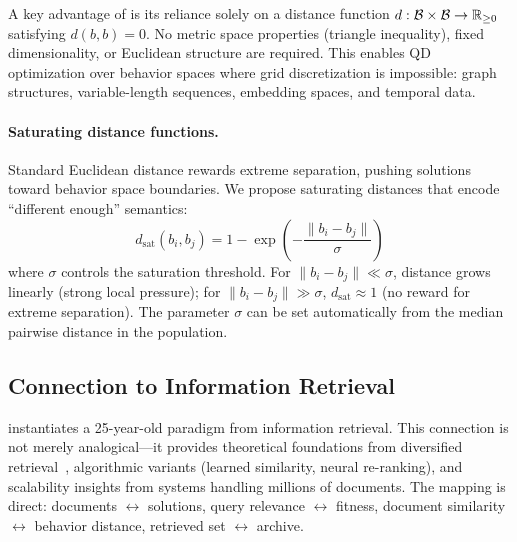A key advantage of \mmr is its reliance solely on a distance function $d: \mathcal{B} \times \mathcal{B} \to \mathbb{R}_{\geq 0}$ satisfying $d(b, b) = 0$.
No metric space properties (triangle inequality), fixed dimensionality, or Euclidean structure are required.
This enables QD optimization over behavior spaces where grid discretization is impossible: graph structures, variable-length sequences, embedding spaces, and temporal data.

\paragraph{Saturating distance functions.}
Standard Euclidean distance rewards extreme separation, pushing solutions toward behavior space boundaries.
We propose saturating distances that encode ``different enough'' semantics:
\begin{equation}
\label{eq:saturating}
d_{\text{sat}}(b_i, b_j) = 1 - \exp\left(-\frac{\|b_i - b_j\|}{\sigma}\right)
\end{equation}
where $\sigma$ controls the saturation threshold.
For $\|b_i - b_j\| \ll \sigma$, distance grows linearly (strong local pressure); for $\|b_i - b_j\| \gg \sigma$, $d_{\text{sat}} \approx 1$ (no reward for extreme separation).
The parameter $\sigma$ can be set automatically from the median pairwise distance in the population.

\subsection{Connection to Information Retrieval}
\label{sec:ir_connection}

\mmr instantiates a 25-year-old paradigm from information retrieval.
This connection is not merely analogical---it provides theoretical foundations from diversified retrieval~\cite{carbonell1998use}, algorithmic variants (learned similarity, neural re-ranking), and scalability insights from systems handling millions of documents.
The mapping is direct: documents $\leftrightarrow$ solutions, query relevance $\leftrightarrow$ fitness, document similarity $\leftrightarrow$ behavior distance, retrieved set $\leftrightarrow$ archive.
